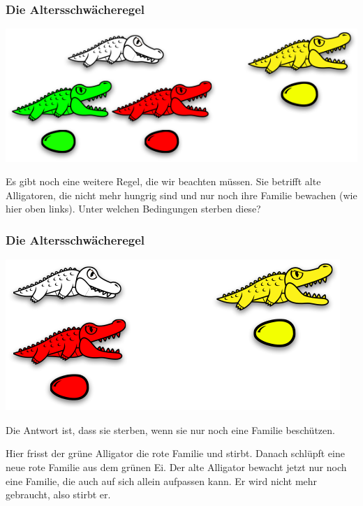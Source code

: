 \documentclass{beamer}
\begin{document}

\begin{frame}
\frametitle{Die Altersschwächeregel}

\begin{center}
\includegraphics[scale=0.35]{old_1.png} 
\end{center}

Es gibt noch eine weitere Regel, die wir beachten müssen. Sie betrifft alte Alligatoren, die nicht mehr hungrig sind und nur noch ihre Familie bewachen (wie hier oben links). Unter welchen Bedingungen sterben diese?

\end{frame}


\begin{frame}
\frametitle{Die Altersschwächeregel}

\begin{center}
\includegraphics[scale=0.35]{old_2.png} 
\end{center}

Die Antwort ist, dass sie sterben, wenn sie nur noch eine Familie beschützen.\bigskip

Hier frisst der grüne Alligator die rote Familie und stirbt. Danach schlüpft eine neue rote Familie aus dem grünen Ei. Der alte Alligator bewacht jetzt nur noch eine Familie, die auch auf sich allein aufpassen kann. Er wird nicht mehr gebraucht, also stirbt er.

\end{frame}
\end{document}

